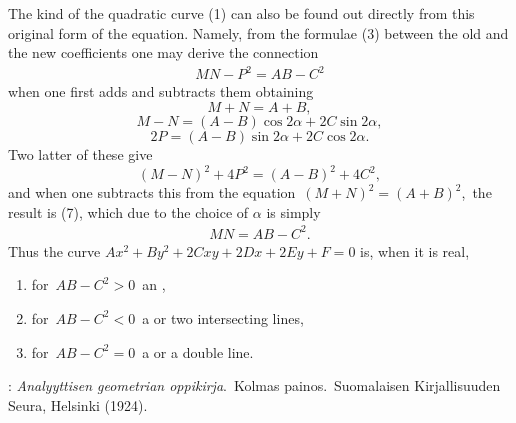 \documentclass[12pt]{article}
\theoremstyle{definition}
\begin{document}
The kind of the quadratic curve (1) can also be found out directly from this original form of the equation.  Namely, from the formulae (3) between the old and the new coefficients one may derive the connection
\begin{align}
MN-P^2 = AB-C^2
\end{align}
when one first adds and subtracts them obtaining
$$M+N = A+B,$$
$$M-N = (A-B)\cos2\alpha+2C\sin2\alpha,$$
$$2P = (A-B)\sin2\alpha+2C\cos2\alpha.$$
Two latter of these give
$$(M-N)^2+4P^2 = (A-B)^2+4C^2,$$
and when one subtracts this from the equation\, $(M+N)^2 = (A+B)^2$,\, 
the result is (7), which due to the choice of $\alpha$ is simply
\begin{align}
MN = AB-C^2.
\end{align}
Thus the curve\; $Ax^2+By^2+2Cxy+2Dx+2Ey+F = 0$\; is, when it is real, 
\begin{enumerate}
\item for\, $AB-C^2 > 0$\, an ,
\item for\, $AB-C^2 < 0$\, a  or two intersecting lines,
\item for\, $AB-C^2 = 0$\, a  or a double line.
\end{enumerate}

\begin{thebibliography}{8}
: {\em Analyyttisen geometrian oppikirja}.\, Kolmas painos.\, Suomalaisen Kirjallisuuden Seura, Helsinki (1924).
\end{thebibliography}

\end{document}
